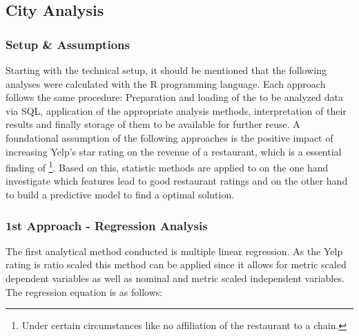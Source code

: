 \subsection{City Analysis}
\label{subsec:analysis}


\subsubsection{Setup \& Assumptions}
Starting with the technical setup, it should be mentioned that the following analyses were calculated with the R programming language. Each approach follows the same procedure: Preparation and loading of the to be analyzed data via SQL, application of the appropriate analysis methods, interpretation of their results and finally storage of them to be available for further reuse.\newline
A foundational assumption of the following approaches is the positive impact of increasing Yelp's star rating on the revenue of a restaurant, which is a essential finding of \cite{CaseOfYelp}\footnote{Under certain circumstances like no affiliation of the restaurant to a chain.}. Based on this, statistic methods are applied to on the one hand investigate which features lead to good restaurant ratings and on the other hand to build a predictive model to find a optimal solution.

\subsubsection{1st Approach -  Regression Analysis}
The first analytical method conducted is multiple linear regression. As the Yelp rating is ratio scaled this method can be applied since it allows for metric scaled dependent variables as well as nominal and metric scaled independent variables. The regression equation is as follows:

